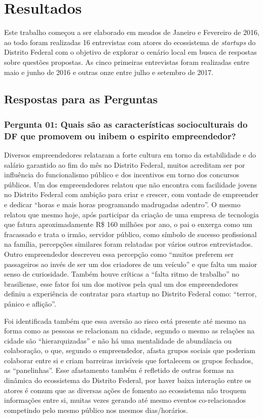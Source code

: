 \chapter[Resultados]{Resultados}
\label{cap-resultados}

Este trabalho começou a ser elaborado em meados de Janeiro e Fevereiro de 2016, ao todo foram realizadas 16 entrevistas com atores do ecossistema de \textit{startups} do Distrito Federal com o objetivo de explorar o cenário local em busca de respostas sobre questões propostas. As cinco primeiras entrevistas foram realizadas entre maio e junho de 2016 e outras onze entre julho e setembro de 2017.

\section{Respostas para as Perguntas}
\label{section:perguntas_de_pesquisa}

\subsection*{Pergunta 01: Quais são as características socioculturais do DF que promovem ou inibem o espirito empreendedor?}
\label{subsection:pergunta_de_pesquisa_1}

Diversos empreendedores relataram a forte cultura em torno da estabilidade e do salário garantido ao fim do mês no Distrito Federal, muitos acreditam ser por influência do funcionalismo público e dos incentivos em torno dos concursos públicos. Um dos empreendedores relatou que não encontra com facilidade jovens no Distrito Federal com ambição para criar e crescer, com vontade de empreender e dedicar ``horas e mais horas programando madrugadas adentro''. O mesmo relatou que mesmo hoje, após participar da criação de uma empresa de tecnologia que fatura aproximadamente R\$ 160 milhões por ano, o pai o enxerga como um fracassado e trata o irmão, servidor público, como símbolo de sucesso profissional na família, percepções similares foram relatadas por vários outros entrevistados. Outro empreendedor descreveu essa percepção como ``muitos preferem ser passageiros ao invés de ser um dos criadores de um veículo'' e que falta um maior senso de curiosidade. Também houve críticas a ``falta ritmo de trabalho'' no brasiliense, esse fator foi um dos motivos pela qual um dos empreendedores definiu a experiência de contratar para startup no Distrito Federal como: ``terror, pânico e aflição''. 

Foi identificada também que essa aversão ao risco está presente até mesmo na forma como as pessoas se relacionam na cidade, segundo o mesmo as relações na cidade são ``hierarquizadas'' e não há uma mentalidade de abundância ou colaboração, o que, segundo o empreendedor, afasta grupos sociais que poderiam colaborar entre si e criam barreiras invisíveis que fortalecem os grupos fechados, as ``panelinhas''. Esse afastamento também é refletido de outras formas na dinâmica do ecossistema do Distrito Federal, por haver baixa interação entre os atores é comum que as diversas ações de fomento ao ecossistema não troquem informações entre si, muitas vezes gerando até mesmo eventos co-relacionados competindo pelo mesmo público nos mesmos dias/horários.

